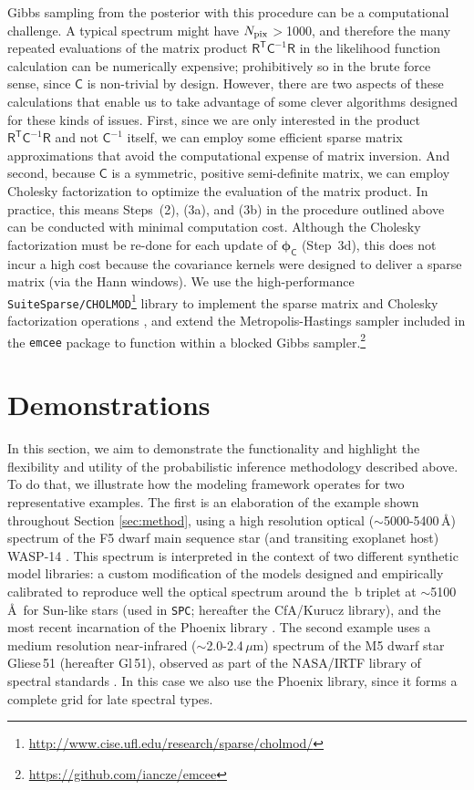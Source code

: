 \documentclass[iop,floatfix]{emulateapj}
\newcommand{\vR}{\mathsf{R}}
\newcommand{\vC}{\mathsf{C}}
\newcommand{\trans}{\mathsf{T}}
\newcommand{\vp}{ {\bm \phi}}
\begin{document}
Gibbs sampling from the posterior with this procedure can be a computational challenge.  A typical 
spectrum might have $N_{\rm pix}$$>$1000, and therefore the many repeated evaluations of the matrix 
product $\vR^{\trans} \vC^{-1} \vR$ in the likelihood function calculation can be numerically 
expensive; prohibitively so in the brute force sense, since $\vC$ is non-trivial by design.  
However, there are two aspects of these calculations that enable us to take advantage of some 
clever algorithms designed for these kinds of issues.  First, since we are only interested in the 
product $\vR^{\trans} \vC^{-1} \vR$ and not $\vC^{-1}$ itself, we can employ some efficient sparse 
matrix approximations that avoid the computational expense of matrix inversion.  And second, 
because $\vC$ is a symmetric, positive semi-definite matrix, we can employ Cholesky factorization
to optimize the evaluation of the matrix product.  In practice, this means Steps~(2), (3a), and 
(3b) in the procedure outlined above can be conducted with minimal computation cost.  Although the
Cholesky factorization must be re-done for each update of $\vp_{\mathsf C}$ (Step~3d), this does 
not incur a high cost because the covariance kernels were designed to deliver a sparse matrix (via 
the Hann windows).  We use the high-performance 
\texttt{SuiteSparse/CHOLMOD}\footnote{\url{http://www.cise.ufl.edu/research/sparse/cholmod/}} 
library to implement the sparse matrix and Cholesky factorization operations \citep{chen08,
davis09}, and extend the Metropolis-Hastings sampler included in the {\tt emcee} package 
\citep{foreman-mackey13} to function within a blocked Gibbs 
sampler.\footnote{\url{https://github.com/iancze/emcee}} \\


\section{Demonstrations} \label{sec:examples}

In this section, we aim to demonstrate the functionality and highlight the flexibility and utility 
of the probabilistic inference methodology described above.  To do that, we illustrate how the 
modeling framework operates for two representative examples.  The first is an elaboration of the 
example shown throughout Section \ref{sec:method}, using a high resolution optical 
($\sim$5000-5400\,\AA) spectrum of the F5 dwarf main sequence star (and transiting exoplanet host) 
WASP-14 \citep{joshi09,torres12}.  This spectrum is interpreted in the context of two different 
synthetic model libraries: a custom modification of the \citet{castelli04} models designed and 
empirically calibrated to reproduce well the optical spectrum around the \,b triplet at 
$\sim$5100\,\AA\ for Sun-like stars (used in {\tt SPC}; hereafter the {\sc CfA/Kurucz} library), 
and the most recent incarnation of the {\sc Phoenix} library \citep{husser13}.  The second 
example uses a medium resolution near-infrared ($\sim$2.0-2.4\,$\mu$m) spectrum of the M5 dwarf 
star Gliese\,51 (hereafter Gl\,51), observed as part of the NASA/IRTF library of spectral standards 
\citep{cushing05,rayner09}.  In this case we also use the {\sc Phoenix} library, since it forms a complete grid for late spectral types.
\end{document}
